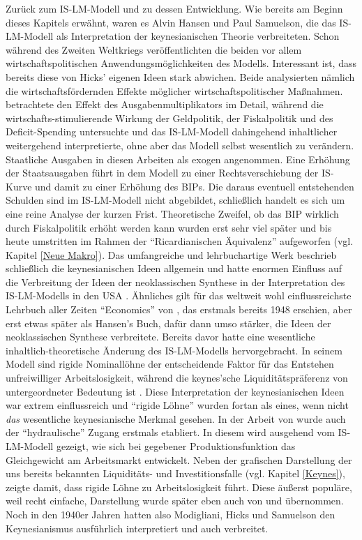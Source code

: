 Zurück zum IS-LM-Modell und zu dessen Entwicklung. Wie bereits am Beginn dieses Kapitels erwähnt, waren es Alvin Hansen und Paul Samuelson, die das IS-LM-Modell als Interpretation der keynesianischen Theorie verbreiteten. Schon während des Zweiten Weltkriegs veröffentlichten die beiden vor allem wirtschaftspolitischen Anwendungsmöglichkeiten des Modells. Interessant ist, dass bereits diese von Hicks' eigenen Ideen stark abwichen. Beide analysierten nämlich die wirtschaftsfördernden Effekte möglicher wirtschaftspolitischer Maßnahmen. \textcite{Samuelson1939} betrachtete den Effekt des Ausgabenmultiplikators im Detail, während \textcite{Hansen1941, Hansen1945, Hansen1949} die wirtschafts-stimulierende Wirkung der Geldpolitik, der Fiskalpolitik und des Deficit-Spending untersuchte und das IS-LM-Modell dahingehend inhaltlicher weitergehend interpretierte, ohne aber das Modell selbst wesentlich zu verändern. Staatliche Ausgaben in diesen Arbeiten als exogen angenommen. Eine Erhöhung der Staatsausgaben führt in dem Modell zu einer Rechtsverschiebung der IS-Kurve und damit zu einer Erhöhung des BIPs. Die daraus eventuell entstehenden Schulden sind im IS-LM-Modell nicht abgebildet, schließlich handelt es sich um eine reine Analyse der kurzen Frist. Theoretische Zweifel, ob das BIP wirklich durch Fiskalpolitik erhöht werden kann wurden erst sehr viel später und bis heute umstritten im Rahmen der "`Ricardianischen Äquivalenz"' aufgeworfen (vgl. Kapitel \ref{Neue Makro}). Das umfangreiche und lehrbuchartige Werk \textcite{Hansen1953} beschrieb schließlich die keynesianischen Ideen allgemein und hatte enormen Einfluss auf die Verbreitung der Ideen der neoklassischen Synthese in der Interpretation des IS-LM-Modells in den USA \parencite[S. 201]{Snowdon2005}. Ähnliches gilt für das weltweit wohl einflussreichste Lehrbuch aller Zeiten "`Economics"' von \textcite{Samuelson1998}, das erstmals bereits 1948 erschien, aber erst etwas später als Hansen's Buch, dafür dann umso stärker, die Ideen der neoklassischen Synthese verbreitete. Bereits davor hatte \textcite{Modigliani1944} eine wesentliche inhaltlich-theoretische Änderung des IS-LM-Modells hervorgebracht. In seinem Modell sind rigide Nominallöhne der entscheidende Faktor für das Entstehen unfreiwilliger Arbeitslosigkeit, während die keynes'sche Liquiditätspräferenz von untergeordneter Bedeutung ist \parencite[S. 66]{Modigliani1944}. Diese Interpretation der keynesianischen Ideen war extrem einflussreich und "`rigide Löhne"' wurden fortan als eines, wenn nicht \textit{das} wesentliche keynesianische Merkmal gesehen. In der Arbeit von \textcite{Modigliani1944} wurde auch der "`hydraulische"' Zugang erstmals etabliert. In diesem wird ausgehend vom IS-LM-Modell gezeigt, wie sich bei gegebener Produktionsfunktion das Gleichgewicht am Arbeitsmarkt entwickelt. Neben der grafischen Darstellung der uns bereits bekannten Liquiditäts- und Investitionsfalle (vgl. Kapitel \ref{Keynes}), zeigte \textcite{Modigliani1944} damit, dass rigide Löhne zu Arbeitslosigkeit führt. Diese äußerst populäre, weil recht einfache, Darstellung wurde später eben auch von \textcite{Samuelson1998} und \textcite{Hansen1953} übernommen. Noch in den 1940er Jahren hatten also Modigliani, Hicks und Samuelson den Keynesianismus ausführlich interpretiert und auch verbreitet. 